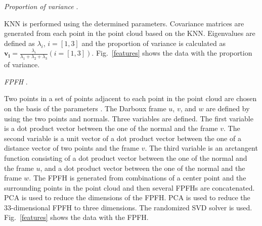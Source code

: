   \textit{Proportion of variance} \cite{BRODU2012121}. 
    \begin{deletedblock}
    KNN is performed using the determined parameters. 
    Covariance matrices are generated from each point in the point cloud based on the KNN. 
    Eigenvalues are defined as ${\lambda}_i$, $i=[1, 3]$ and the proportion of variance is calculated as $\boldsymbol{v_i}=\frac{{\lambda}_i}{{\lambda}_1+{\lambda}_2+{\lambda}_3}(i=[1, 3])$. 
    Fig.~\ref{features} shows the data with the proportion of variance. 
    \end{deletedblock}
  \textit{FPFH} \cite{5152473}. 
    \begin{deletedblock}
    Two points in a set of points adjacent to each point in the point cloud are chosen on the basis of the parameters \cite{4795593,4650967}. 
    The Darboux frame $u$, $v$, and $w$ are defined by using the two points and normals. 
    Three variables are defined. 
      The first variable is a dot product vector between the one of the normal and the frame $v$. 
      The second variable is a unit vector of a dot product vector between the one of a distance vector of two points and the frame $v$. 
      The third variable is an arctangent function consisting of a dot product vector between the one of the normal and the frame $u$, and a dot product vector between the one of the normal and the frame $w$. 
      The FPFH is generated from combinations of a center point and the surrounding points in the point cloud and then several FPFHs are concatenated. 
    PCA is used to reduce the dimensions of the FPFH. 
      PCA is used to reduce the 33-dimensional FPFH to three dimensions.
      The randomized SVD solver is used. 
    Fig.~\ref{features} shows the data with the FPFH. 
    \end{deletedblock}

